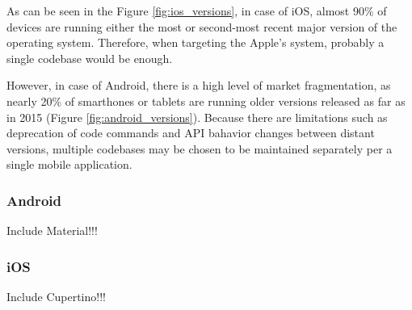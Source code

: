 As can be seen in the Figure \ref{fig:ios_versions}, in case of iOS, almost 90\% of devices are running either the most or second-most recent major version of the operating system. Therefore, when targeting the Apple's system, probably a single codebase would be enough.

However, in case of Android, there is a high level of market fragmentation, as nearly 20\% of smarthones or tablets are running older versions released as far as in 2015 (Figure \ref{fig:android_versions}). Because there are limitations such as deprecation of code commands and API bahavior changes between distant versions, multiple codebases may be chosen to be maintained separately per a single mobile application.

\subsubsection{Android}
Include Material!!!

\subsubsection{iOS}
Include Cupertino!!!
